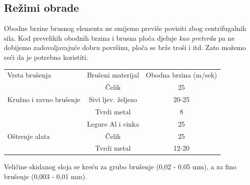 \documentclass[a4paper,12pt]{article}
\numberwithin{figure}{section}
\begin{document}
\subsection{Režimi obrade}
Obodne brzine brusnog elementa ne smijemo previše povisiti zbog centrifugalnih sila. Kod prevelikih obodnih brzina i brusna ploča djeluje \textit{kao pretvrda} pa ne dobijemo zadovoljavajuće dobru površinu, ploča se brže troši i itd. Zato možemo reći da je potrebno koristiti.
\begin{table}[!h]
\centering
\begin{tabular}{lcc}
Vrsta brušenja          & Brušeni materijal  & Obodna brzina (m/sek) \\
                        & Čelik              & 25                    \\
Kružno i ravno brušenje & Sivi ljev. željezo & 20-25                 \\
                        & Tvrdi metal        & 8                     \\
                        & Legure Al i cinka  & 25                    \\
Oštrenje alata          & Čelik              & 25                    \\
                        & Tvrdi metal        & 12-20                
\end{tabular}
\end{table}
\FloatBarrier
Veličine skidanog sloja se kreću za grubo brušenje (0,02 - 0,05 mm), a za fino brušenje (0,003 - 0,01 mm).
\end{document}
